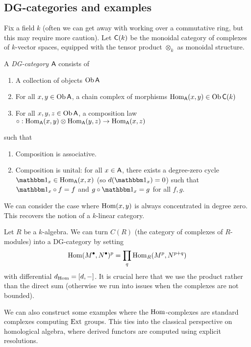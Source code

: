 \documentclass{amsart}
\begin{document}
\subsection{DG-categories and examples}

Fix a field $k$ (often we can get away with working over a commutative ring, but this may require more caution).
Let $\mathsf{C}(k)$ be the monoidal category of complexes of $k$-vector spaces, equipped with the tensor product $\otimes_k$ as monoidal structure.

\begin{dfn}
A \emph{DG-category} $\mathsf{A}$ consists of 
\begin{enumerate}
	\item A collection of objects $\operatorname{Ob} \mathsf{A}$
	\item For all $x, y \in \operatorname{Ob} \mathsf{A}$, a chain complex of morphisms $\operatorname{Hom}_{\mathsf{A}}(x, y) \in \operatorname{Ob} \mathsf{C}(k)$
	\item For all $x, y, z \in \operatorname{Ob} \mathsf{A}$, a composition law $\circ: \operatorname{Hom}_{\mathsf{A}}(x, y) \otimes \operatorname{Hom}_{\mathsf{A}}(y, z) \to \operatorname{Hom}_{\mathsf{A}}(x, z)$
\end{enumerate}
such that
\begin{enumerate}
	\item Composition is associative.
	\item Composition is unital: for all $x \in \mathsf{A}$, there exists a degree-zero cycle $\onebb_x \in \Hom_{\Asf}(x, x)$ (so $d(\onebb_x) = 0$) such that $\onebb_x \circ f = f$ and $g \circ \onebb_x = g$ for all $f, g$.
\end{enumerate}
\end{dfn}

\begin{ex}
We can consider the case where $\operatorname{Hom}(x, y)$ is always concentrated in degree zero.
This recovers the notion of a $k$-linear category.
\end{ex}

\begin{ex}
Let $R$ be a $k$-algebra.
We can turn $C(R)$ (the category of complexes of $R$-modules) into a DG-category by setting
\[
\operatorname{Hom}(M^\bullet, N^\bullet)^p = \prod_{q} \operatorname{Hom}_R(M^p, N^{p+q})
\]
with differential $d_{\operatorname{Hom}} = [d, -]$.
It is crucial here that we use the product rather than the direct sum (otherwise we run into issues when the complexes are not bounded).
\end{ex}

We can also construct some examples where the $\operatorname{Hom}$-complexes are standard complexes computing $\operatorname{Ext}$ groups.
This ties into the classical perspective on homological algebra, where derived functors are computed using explicit resolutions.
\end{document}
